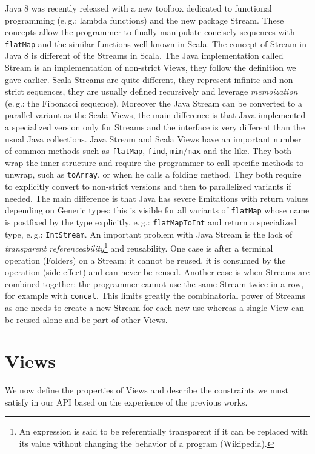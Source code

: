 \documentclass[a4paper,12pt,twocolumn]{article}
\newcommand{\eg}{e.\,g.}
\begin{document}
Java 8 was recently released with a new toolbox dedicated to functional programming (\eg: lambda functions) and the new package Stream.
These concepts allow the programmer to finally manipulate concisely sequences with \verb|flatMap| and the similar functions well known in Scala.
The concept of Stream in Java 8 is different of the Streams in Scala.
The Java implementation called Stream is an implementation of non-strict Views, they follow the definition we gave earlier.
Scala Streams are quite different, they represent infinite and non-strict sequences, they are usually defined recursively and leverage {\it memoization}\/ (\eg: the Fibonacci sequence).
Moreover the Java Stream can be converted to a parallel variant as the Scala Views, the main difference is that Java implemented a specialized version only for Streams and the interface is very different than the usual Java collections.
Java Stream and Scala Views have an important number of common methods such as \verb|flatMap|, \verb|find|, \verb|min|/\verb|max| and the like.
They both wrap the inner structure and require the programmer to call specific methods to unwrap, such as \verb|toArray|, or when he calls a folding method.
They both require to explicitly convert to non-strict versions and then to parallelized variants if needed.
The main difference is that Java has severe limitations with return values depending on Generic types: this is visible for all variants of \verb|flatMap| whose name is postfixed by the type explicitly, \eg: \verb|flatMapToInt| and return a specialized type, \eg: \verb|IntStream|.
An important problem with Java Stream is the lack of {\it transparent referenceability}\footnote{An expression is said to be referentially transparent if it can be replaced with its value without changing the behavior of a program (Wikipedia).} and reusability.
One case is after a terminal operation (Folders) on a Stream: it cannot be reused, it is consumed by the operation (side-effect) and can never be reused.
Another case is when Streams are combined together: the programmer cannot use the same Stream twice in a row, for example with \verb|concat|.
This limits greatly the combinatorial power of Streams as one needs to create a new Stream for each new use whereas a single View can be reused alone and be part of other Views.

\section{Views}
We now define the properties of Views and describe the constraints we must satisfy in our API based on the experience of the previous works.
\end{document}
